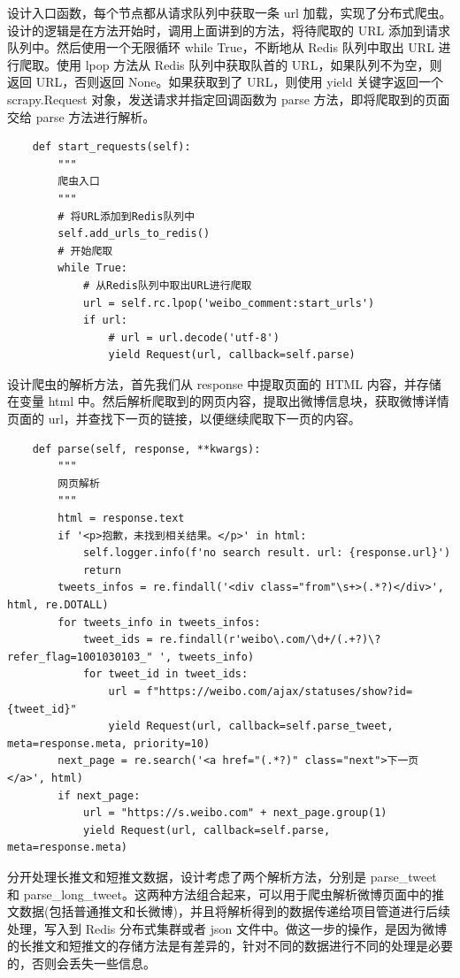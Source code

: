 \documentclass[12pt,hyperref,a4paper,UTF8]{ctexart}
\begin{document}
设计入口函数，每个节点都从请求队列中获取一条 url 加载，实现了分布式爬虫。设计的逻辑是在方法开始时，调用上面讲到的方法，将待爬取的 URL 添加到请求队列中。然后使用一个无限循环 while True，不断地从 Redis 队列中取出 URL 进行爬取。使用 lpop 方法从 Redis 队列中获取队首的 URL，如果队列不为空，则返回 URL，否则返回 None。如果获取到了 URL，则使用 yield 关键字返回一个 scrapy.Request 对象，发送请求并指定回调函数为 parse 方法，即将爬取到的页面交给 parse 方法进行解析。

\begin{verbatim}  
    def start_requests(self):
        """
        爬虫入口
        """
        # 将URL添加到Redis队列中
        self.add_urls_to_redis()
        # 开始爬取
        while True:
            # 从Redis队列中取出URL进行爬取
            url = self.rc.lpop('weibo_comment:start_urls')
            if url:
                # url = url.decode('utf-8')
                yield Request(url, callback=self.parse)
\end{verbatim}

设计爬虫的解析方法，首先我们从 response 中提取页面的 HTML 内容，并存储在变量 html 中。然后解析爬取到的网页内容，提取出微博信息块，获取微博详情页面的 url，并查找下一页的链接，以便继续爬取下一页的内容。

\begin{verbatim}  
    def parse(self, response, **kwargs):
        """
        网页解析
        """
        html = response.text
        if '<p>抱歉，未找到相关结果。</p>' in html:
            self.logger.info(f'no search result. url: {response.url}')
            return
        tweets_infos = re.findall('<div class="from"\s+>(.*?)</div>', html, re.DOTALL)
        for tweets_info in tweets_infos:
            tweet_ids = re.findall(r'weibo\.com/\d+/(.+?)\?refer_flag=1001030103_" ', tweets_info)
            for tweet_id in tweet_ids:
                url = f"https://weibo.com/ajax/statuses/show?id={tweet_id}"
                yield Request(url, callback=self.parse_tweet, meta=response.meta, priority=10)
        next_page = re.search('<a href="(.*?)" class="next">下一页</a>', html)
        if next_page:
            url = "https://s.weibo.com" + next_page.group(1)
            yield Request(url, callback=self.parse, meta=response.meta)
\end{verbatim}

分开处理长推文和短推文数据，设计考虑了两个解析方法，分别是 parse\_tweet 和 parse\_long\_tweet。这两种方法组合起来，可以用于爬虫解析微博页面中的推文数据(包括普通推文和长微博)，并且将解析得到的数据传递给项目管道进行后续处理，写入到 Redis 分布式集群或者 json 文件中。做这一步的操作，是因为微博的长推文和短推文的存储方法是有差异的，针对不同的数据进行不同的处理是必要的，否则会丢失一些信息。
\end{document}
